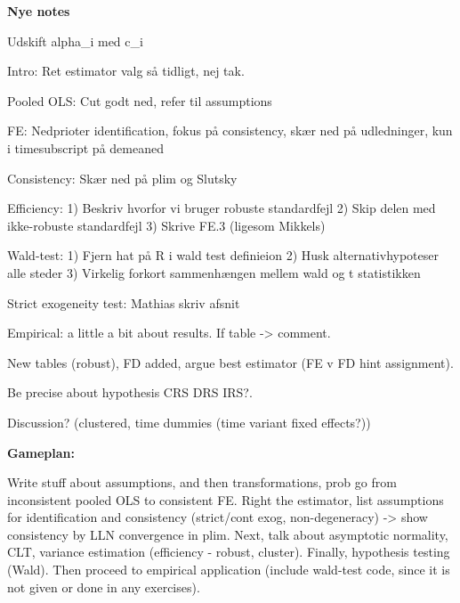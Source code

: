 \textbf{Nye notes}

Udskift alpha_i med c_i

Intro: Ret estimator valg så tidligt, nej tak. 

Pooled OLS: Cut godt ned, refer til assumptions

FE: Nedprioter identification, fokus på consistency, skær ned på udledninger, kun i timesubscript på demeaned

Consistency: Skær ned på plim og Slutsky

Efficiency:
1) Beskriv hvorfor vi bruger robuste standardfejl
2) Skip delen med ikke-robuste standardfejl
3) Skrive FE.3 (ligesom Mikkels)

Wald-test:
1) Fjern hat på R i wald test definieion
2) Husk alternativhypoteser alle steder
3) Virkelig forkort sammenhængen mellem wald og t statistikken

Strict exogeneity test: Mathias skriv afsnit

Empirical: 
a little a bit about results. If table -> comment. 

New tables (robust), FD added, argue best estimator (FE v FD hint assignment). 

Be precise about hypothesis CRS DRS IRS?. 

Discussion? (clustered, time dummies (time variant fixed effects?)) 

\textbf{Gameplan:}

Write stuff about assumptions, and then transformations, prob go from inconsistent pooled OLS to consistent FE. Right the estimator, list assumptions for identification and consistency (strict/cont exog, non-degeneracy) -> show consistency by LLN convergence in plim. Next, talk about asymptotic normality, CLT, variance estimation (efficiency - robust, cluster). Finally, hypothesis testing (Wald). Then proceed to empirical application (include wald-test code, since it is not given or done in any exercises).

